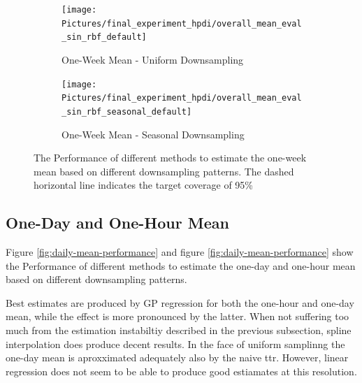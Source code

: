 \begin{figure}[!ht]
\centering
\begin{subfigure}{\textwidth}
    \centering
    \texttt{[image: Pictures/final\_experiment\_hpdi/overall\_mean\_eval\_sin\_rbf\_default]}
    \caption{One-Week Mean - Uniform Downsampling}
    \label{fig:weekly-mean-uniform-sampling-performance}
\end{subfigure}

\bigskip

\begin{subfigure}{\textwidth}
    \centering
    \texttt{[image: Pictures/final\_experiment\_hpdi/overall\_mean\_eval\_sin\_rbf\_seasonal\_default]}
    \caption{One-Week Mean - Seasonal Downsampling}
    \label{fig:weekly-mean-seasonal-sampling-performance}
\end{subfigure}
\caption[One-Week Mean Performance]{The Performance of different methods to
estimate the one-week mean based on different downsampling patterns. The dashed horizontal line
indicates the target coverage of 95\% 
}
\label{fig:weekly-mean-performance}
\end{figure}



\subsection{One-Day and One-Hour Mean}

Figure \ref{fig:daily-mean-performance} and figure \ref{fig:daily-mean-performance}
show the Performance of different methods to
estimate the one-day and one-hour mean based on different downsampling patterns.

Best estimates are produced by GP regression for both the one-hour and one-day mean,
while the effect is more pronounced by the latter.
When not suffering too much from the estimation
instabiltiy described in the previous subsection,
spline interpolation does produce decent results.
In the face of uniform samplinng the one-day mean is aproxximated adequately also
by the naive ttr.
However, linear regression does not seem to be able to produce good estiamates
at this resolution.



